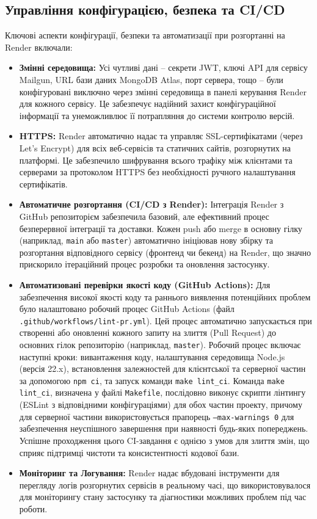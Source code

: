 \subsection{Управління конфігурацією, безпека та CI/CD}
Ключові аспекти конфігурації, безпеки та автоматизації при розгортанні на Render включали:
\begin{itemize}
    \item \textbf{Змінні середовища:} Усі чутливі дані – секрети JWT, ключі API для сервісу Mailgun, URL бази даних MongoDB Atlas, порт сервера, тощо – були конфігуровані виключно через змінні середовища в панелі керування Render для кожного сервісу. Це забезпечує надійний захист конфігураційної інформації та унеможливлює її потрапляння до системи контролю версій.
    \item \textbf{HTTPS:} Render автоматично надає та управляє SSL-сертифікатами (через Let's Encrypt) для всіх веб-сервісів та статичних сайтів, розгорнутих на платформі. Це забезпечило шифрування всього трафіку між клієнтами та серверами за протоколом HTTPS без необхідності ручного налаштування сертифікатів.
    \item \textbf{Автоматичне розгортання (CI/CD з Render):} Інтеграція Render з GitHub репозиторієм забезпечила базовий, але ефективний процес безперервної інтеграції та доставки. Кожен push або merge в основну гілку (наприклад, \texttt{main} або \texttt{master}) автоматично ініціював нову збірку та розгортання відповідного сервісу (фронтенд чи бекенд) на Render, що значно прискорило ітераційний процес розробки та оновлення застосунку.
    \item \textbf{Автоматизовані перевірки якості коду (GitHub Actions):} Для забезпечення високої якості коду та раннього виявлення потенційних проблем було налаштовано робочий процес GitHub Actions (файл \texttt{.github/workflows/lint-pr.yml}). Цей процес автоматично запускається при створенні або оновленні кожного запиту на злиття (Pull Request) до основних гілок репозиторію (наприклад, \texttt{master}). Робочий процес включає наступні кроки: вивантаження коду, налаштування середовища Node.js (версія 22.x), встановлення залежностей для клієнтської та серверної частин за допомогою \texttt{npm ci}, та запуск команди \texttt{make lint\_ci}. Команда \texttt{make lint\_ci}, визначена у файлі \texttt{Makefile}, послідовно виконує скрипти лінтингу (ESLint з відповідними конфігураціями) для обох частин проекту, причому для серверної частини використовується прапорець \texttt{--max-warnings 0} для забезпечення неуспішного завершення при наявності будь-яких попереджень. Успішне проходження цього CI-завдання є однією з умов для злиття змін, що сприяє підтримці чистоти та консистентності кодової бази.
    \item \textbf{Моніторинг та Логування:} Render надає вбудовані інструменти для перегляду логів розгорнутих сервісів в реальному часі, що використовувалося для моніторингу стану застосунку та діагностики можливих проблем під час роботи.
\end{itemize}

